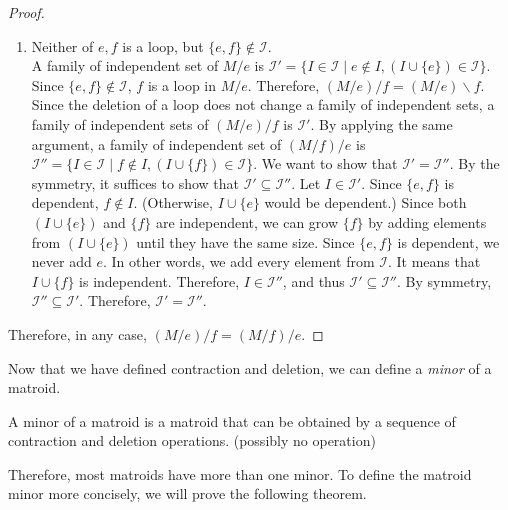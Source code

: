 \begin{proof}
\begin{enumerate}
\item Neither of $e, f$ is a loop, but $\{ e, f \} \notin \mathcal{I}$.\\
A family of independent set of $M / e$ is $\mathcal{I}' = \{ I \in \mathcal{I} \mid e \notin I, (I \cup \{ e \}) \in \mathcal{I} \}$.
Since $\{ e, f \} \notin \mathcal{I}$, $f$ is a loop in $M / e$.
Therefore, $(M / e) / f = (M / e) \backslash f$.
Since the deletion of a loop does not change a family of independent sets, a family of independent sets of $(M / e) / f$ is $\mathcal{I}'$.
By applying the same argument, a family of independent set of $(M / f) / e$ is $\mathcal{I}'' = \{ I \in \mathcal{I} \mid f \notin I, (I \cup \{ f \} ) \in \mathcal{I} \}$.
We want to show that $\mathcal{I}'  = \mathcal{I}''$.
By the symmetry, it suffices to show that $\mathcal{I}' \subseteq \mathcal{I}''$.
Let $I \in \mathcal{I}'$.
Since $\{ e, f \}$ is dependent, $f \notin I$. (Otherwise, $I \cup \{ e \}$ would be dependent.)
Since both $(I \cup \{ e \})$ and $\{ f \}$ are independent, we can grow $\{ f \}$ by adding elements from $(I \cup \{ e \})$ until they have the same size.
Since $\{ e, f\}$ is dependent, we never add $e$.
In other words, we add every element from $\mathcal{I}$.
It means that $I \cup \{ f \}$ is independent.
Therefore, $I \in \mathcal{I}''$, and thus $\mathcal{I}' \subseteq \mathcal{I}''$.
By symmetry, $\mathcal{I}'' \subseteq \mathcal{I}'$.
Therefore, $\mathcal{I}' = \mathcal{I}''$.
\end{enumerate}

Therefore, in any case, $(M / e) / f = (M / f) / e$.
\end{proof}



Now that we have defined contraction and deletion, we can define a \textit{minor} of a matroid.

\begin{defn}
A minor of a matroid is a matroid that can be obtained by a sequence of contraction and deletion operations. (possibly no operation)
\end{defn}

Therefore, most matroids have more than one minor.
To define the matroid minor more concisely, we will prove the following theorem.


